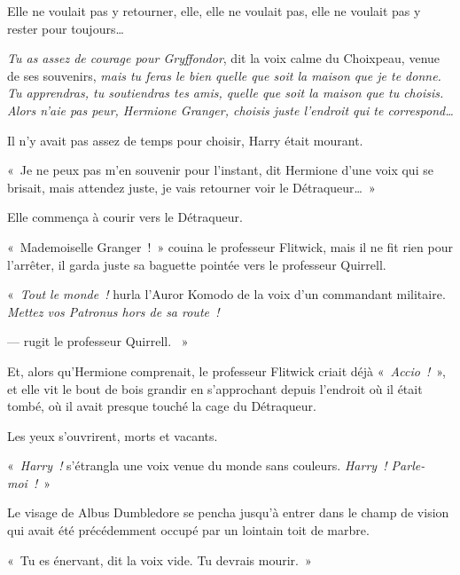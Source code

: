 Elle ne voulait pas y retourner, elle, elle ne voulait pas, elle ne voulait pas y rester pour toujours…

\emph{Tu as assez de courage pour Gryffondor}, dit la voix calme du Choixpeau, venue de ses souvenirs, \emph{mais tu feras le bien quelle que soit la maison que je te donne.
Tu apprendras, tu soutiendras tes amis, quelle que soit la maison que tu choisis.
Alors n'aie pas peur, Hermione Granger, choisis juste l'endroit qui te correspond…}

Il n'y avait pas assez de temps pour choisir, Harry était mourant.

«~Je ne peux pas m'en souvenir pour l'instant, dit Hermione d'une voix qui se brisait, mais attendez juste, je vais retourner voir le Détraqueur…~»

Elle commença à courir vers le Détraqueur.

«~Mademoiselle Granger~!~»
couina le professeur Flitwick, mais il ne fit rien pour l'arrêter, il garda juste sa baguette pointée vers le professeur Quirrell.

«~\emph{Tout le monde~!} hurla l'Auror Komodo de la voix d'un commandant militaire.
\emph{Mettez vos Patronus hors de sa route~!}

---  rugit le professeur Quirrell.
~»

Et, alors qu'Hermione comprenait, le professeur Flitwick criait déjà «~\emph{Accio~!}~», et elle vit le bout de bois grandir en s'approchant depuis l'endroit où il était tombé, où il avait presque touché la cage du Détraqueur.

\later

Les yeux s'ouvrirent, morts et vacants.

«~\emph{Harry~!} s'étrangla une voix venue du monde sans couleurs.
\emph{Harry~!
Parle-moi~!}~»

Le visage de Albus Dumbledore se pencha jusqu'à entrer dans le champ de vision qui avait été précédemment occupé par un lointain toit de marbre.

«~Tu es énervant, dit la voix vide.
Tu devrais mourir.~»

